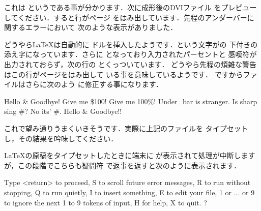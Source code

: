 {{{{{\begin{Exe}
これは 
というである事が分かります．次に成形後のDVIファイル
をプレビューしてください．すると行がページ
をはみ出しています．先程のアンダーバーに関するエラーにおいて
次のような表示がありました．


どうやら{\LaTeX}は自動的に%
ドル\qu{\texttt\$}を挿入したようです．という文字がの
下付きの添え字になっています．さらに
となっており入力されたパーセント\qu{\texttt\%}と
感嘆符\qu{\texttt!}が出力されておらず，次の行の
とくっついています．
%
どうやら先程の煩雑な警告はこの行がページをはみ出して
いる事を意味しているようです．
ですからファイルはさらに次のよう
に修正する事になります．

\begin{InTeX}
Hello \& Goodbye! Give me \$100! Give me 100\%!
Under\_bar is stranger. Is sharp sing \#?
No its' \#. Hello \& Goodbye!!   
\end{InTeX}

これで望み通りうまくいきそうです．実際に上記のファイルを
タイプセットし，その結果を吟味してください．
\end{Exe}

%
{\LaTeX}の原稿をタイプセットしたときに端末に
が表示されて処理が中断しますが，この段階でこちらも疑問符
で返事を返すと次のように表示されます．

\begin{OutTerm}
Type <return> to proceed, S to scroll future error messages,
R to run without stopping, Q to run quietly,
I to insert something, E to edit your file,
1 or ... or 9 to ignore the next 1 to 9 tokens of input,
H for help, X to quit.
? 
\end{OutTerm}

}}}}}
